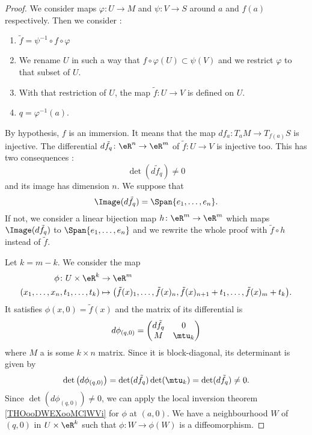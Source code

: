 \begin{proof}
	We consider maps \( \varphi\colon U\to M\) and \( \psi\colon V\to S\) around \( a\) and \( f(a)\) respectively. Then we consider :
	\begin{enumerate}
		\item
		      \( \tilde f=\psi^{-1}\circ f\circ\varphi\)
		\item
		      We rename \( U  \) in such a way that \( f\circ\varphi(U)\subset \psi(V)\) and we restrict \( \varphi\) to that subset of \( U\).
		\item
		      With that restriction of \( U\), the map \( \tilde f\colon U\to V\) is defined on \( U\).
		\item
		      \( q=\varphi^{-1}(a)\).
	\end{enumerate}

	By hypothesis, \( f\) is an immersion. It means that the map \( df_a\colon T_aM\to T_{f(a)}S\) is injective. The differential \( d\tilde f_q\colon \eR^n\to \eR^m\) of \( \tilde f\colon U\to V\) is injective too. This has two consequences :
	\begin{equation}
		\det(d\tilde f_q)\neq 0
	\end{equation}
	and its image has dimension \( n\). We suppose that
	\begin{equation}
		\Image(d\tilde f_q)=\Span\{ e_1,\ldots, e_n \}.
	\end{equation}
	If not, we consider a linear bijection map \( h\colon \eR^m\to \eR^m\) which maps \( \Image(d\tilde f_q)\) to \( \Span\{ e_1,\ldots, e_n \}\) and we rewrite the whole proof with \( \tilde f\circ h\) instead of \( \tilde f\).

	Let \( k=m-k\). We consider the map
	\begin{equation}
		\begin{aligned}
			\phi\colon U\times \eR^k          & \to \eR^m                                                                                                \\
			(x_1,\ldots, x_n,t_1,\ldots, t_k) & \mapsto \big( \tilde f(x)_1,\ldots, \tilde f(x)_n,\tilde f(x)_{n+1}+t_1,\ldots, \tilde f(x)_m+t_k \big).
		\end{aligned}
	\end{equation}
	It satisfies \( \phi(x,0)=\tilde f(x)\) and the matrix of its differential is
	\begin{equation}
		d\phi_{(q,0)}=\begin{pmatrix}
			d\tilde f_q & 0      \\
			M           & \mtu_k
		\end{pmatrix}
	\end{equation}
	where \( M\) a is some \( k\times n\) matrix. Since it is block-diagonal, its determinant is given by
	\begin{equation}
		\det\big( d\phi_{(q,0)} \big)=\det(d\tilde f_q)\det(\mtu_k)=\det(d\tilde f_q)\neq 0.
	\end{equation}
	Since \( \det(d\phi_{(q,0)})\neq 0\), we can apply the local inversion theorem \ref{THOooDWEXooMClWVi} for \( \phi\) at \( (a,0)\). We have a neighbourhood \( W\) of \( (q,0)\) in \( U\times \eR^k\) such that \( \phi\colon W\to \phi(W)\) is a diffeomorphism.


\end{proof}
